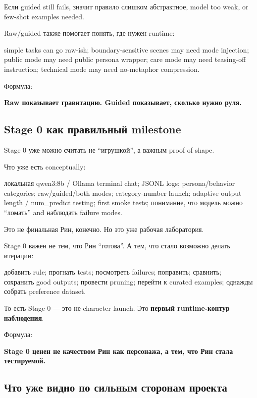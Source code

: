 Если guided still fails, значит правило слишком абстрактное, model too
weak, or few-shot examples needed.

Raw/\hspace{0pt}guided также помогает понять, где нужен runtime:

simple tasks can go raw-ish; boundary-sensitive scenes may need mode
injection; public mode may need public persona wrapper; care mode may
need teasing-off instruction; technical mode may need no-metaphor
compression.

Формула:

\textbf{Raw показывает гравитацию. Guided показывает, сколько нужно
руля.}

\subsection*{Stage 0 как правильный milestone}

Stage 0 уже можно считать не ``игрушкой'', а важным proof of shape.

Что уже есть conceptually:

локальная qwen3:8b /\hspace{0pt} Ollama terminal chat; JSONL logs; persona/\hspace{0pt}behavior
categories; raw/\hspace{0pt}guided/\hspace{0pt}both modes; category-number launch; adaptive
output length /\hspace{0pt} num\_predict testing; first smoke tests; понимание, что
модель можно ``ломать'' and наблюдать failure modes.

Это не финальная Рин, конечно. Но это уже рабочая лаборатория.

Stage 0 важен не тем, что Рин ``готова''. А тем, что стало возможно
делать итерации:

добавить rule; прогнать tests; посмотреть failures; поправить; сравнить;
сохранить good outputs; провести pruning; перейти к curated examples;
однажды собрать preference dataset.

То есть Stage 0 --- это не character launch. Это \textbf{первый
runtime-контур наблюдения}.

Формула:

\textbf{Stage 0 ценен не качеством Рин как персонажа, а тем, что Рин
стала тестируемой.}

\subsection*{Что уже видно по сильным сторонам проекта}

